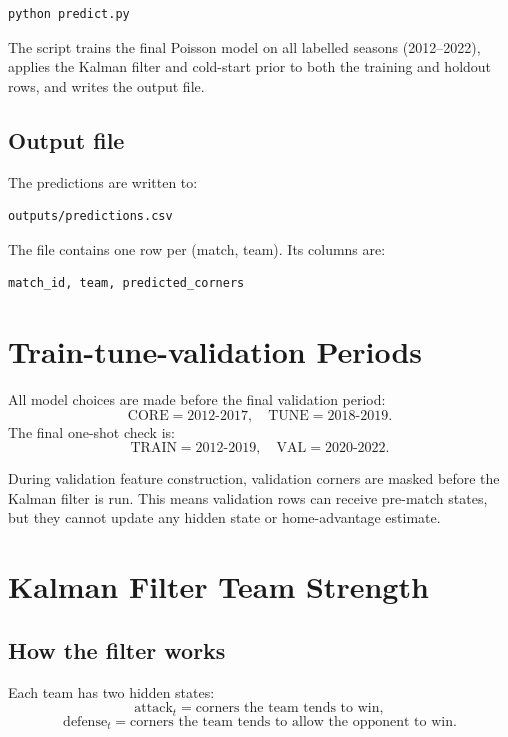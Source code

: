 \documentclass[11pt]{article}
\begin{document}
\begin{verbatim}
python predict.py
\end{verbatim}

The script trains the final Poisson model on all labelled seasons (2012--2022),
applies the Kalman filter and cold-start prior to both the training and holdout
rows, and writes the output file.

\subsection{Output file}

The predictions are written to:

\begin{verbatim}
outputs/predictions.csv
\end{verbatim}

The file contains one row per (match, team). Its columns are:
\begin{verbatim}
match_id, team, predicted_corners
\end{verbatim}

\section{Train-tune-validation Periods}

All model choices are made before the final validation period:
\[
\text{CORE}=2012\text{-}2017,\quad \text{TUNE}=2018\text{-}2019.
\]
The final one-shot check is:
\[
\text{TRAIN}=2012\text{-}2019,\quad \text{VAL}=2020\text{-}2022.
\]

During validation feature construction, validation corners are masked before the
Kalman filter is run. This means validation rows can receive pre-match states,
but they cannot update any hidden state or home-advantage estimate.

\section{Kalman Filter Team Strength}

\subsection{How the filter works}

Each team has two hidden states:
\[
\text{attack}_t = \text{corners the team tends to win},
\]
\[
\text{defense}_t = \text{corners the team tends to allow the opponent to win}.
\]
\end{document}
